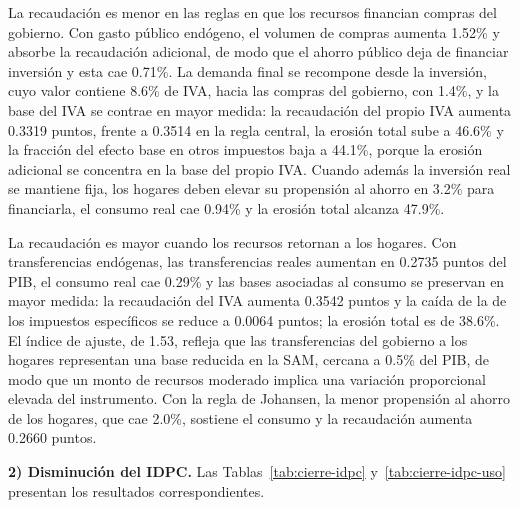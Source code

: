 \documentclass[11pt]{article}
\begin{document}
La recaudación es menor en las reglas en que los recursos financian compras del gobierno. Con gasto público endógeno, el volumen de compras aumenta 1.52\% y absorbe la recaudación adicional, de modo que el ahorro público deja de financiar inversión y esta cae 0.71\%. La demanda final se recompone desde la inversión, cuyo valor contiene 8.6\% de IVA, hacia las compras del gobierno, con 1.4\%, y la base del IVA se contrae en mayor medida: la recaudación del propio IVA aumenta 0.3319 puntos, frente a 0.3514 en la regla central, la erosión total sube a 46.6\% y la fracción del efecto base en otros impuestos baja a 44.1\%, porque la erosión adicional se concentra en la base del propio IVA. Cuando además la inversión real se mantiene fija, los hogares deben elevar su propensión al ahorro en 3.2\% para financiarla, el consumo real cae 0.94\% y la erosión total alcanza 47.9\%.

La recaudación es mayor cuando los recursos retornan a los hogares. Con transferencias endógenas, las transferencias reales aumentan en 0.2735 puntos del PIB, el consumo real cae 0.29\% y las bases asociadas al consumo se preservan en mayor medida: la recaudación del IVA aumenta 0.3542 puntos y la caída de la de los impuestos específicos se reduce a 0.0064 puntos; la erosión total es de 38.6\%. El índice de ajuste, de 1.53, refleja que las transferencias del gobierno a los hogares representan una base reducida en la SAM, cercana a 0.5\% del PIB, de modo que un monto de recursos moderado implica una variación proporcional elevada del instrumento. Con la regla de Johansen, la menor propensión al ahorro de los hogares, que cae 2.0\%, sostiene el consumo y la recaudación aumenta 0.2660 puntos.

\textbf{2) Disminución del IDPC.} Las Tablas~\ref{tab:cierre-idpc} y~\ref{tab:cierre-idpc-uso} presentan los resultados correspondientes.
\end{document}
